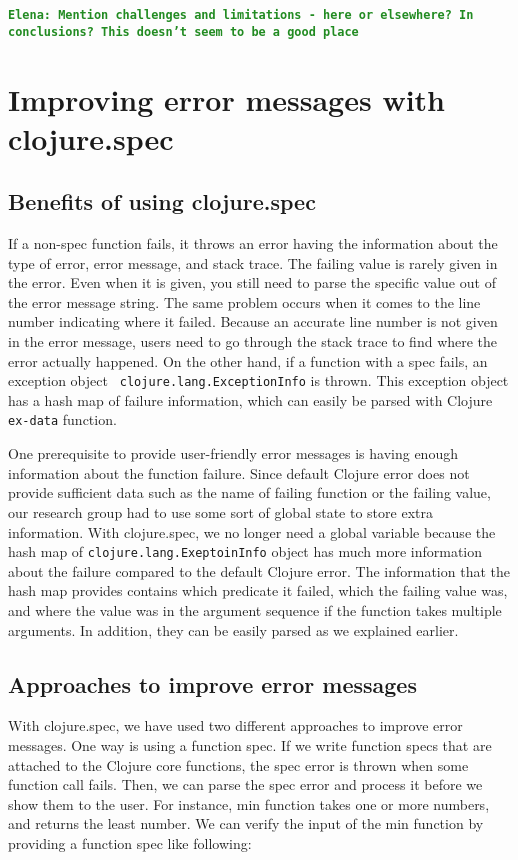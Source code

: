 \documentclass[12pt]{article}
\newcommand{\comment}[1]{{\bf \tt  {#1}}}
\newcommand{\emcomment}[1]{\textcolor{ForestGreen}{\comment{Elena: {#1}}}}
\begin{document}
\emcomment{Mention challenges and limitations - here or elsewhere? In conclusions? 
This doesn't seem to be a good place}

\section{Improving error messages with clojure.spec}
	\subsection{Benefits of using clojure.spec}
	If a non-spec function fails, it throws an error having the information about the type of error, error message, and stack 
	trace. The failing value is rarely given in the error. Even when it is given, you still need to parse the specific value out of 
	the error message string. The same problem occurs when it comes to the line number indicating where it failed. 
	Because an accurate line number is not given in the error message, users need to go through the stack trace to find 
	where the error actually happened. On the other hand, if a function with a spec fails, an exception object {\tt 
	clojure.lang.ExceptionInfo} is thrown. This exception object has a hash map of failure information, which can easily be 
	parsed with Clojure {\tt ex-data} function. 

	One prerequisite to provide user-friendly error messages is having enough information about the function failure. Since 
	default Clojure error does not provide sufficient data such as the name of failing function or the failing value, our 
	research group had to use some sort of global state to store extra information. With clojure.spec, we no longer need a 
	global variable because the hash map of {\tt clojure.lang.ExeptoinInfo} object has much more information about the 
	failure compared to the default Clojure error. The information that the hash map provides contains which predicate it 
	failed, which the failing value was, and where the value was in the argument sequence if the function takes multiple 
	arguments. In addition, they can be easily parsed as we explained earlier.
	
	\subsection{Approaches to improve error messages}
	With clojure.spec, we have used two different approaches to improve error messages. One way is using a function spec. 
	If we write function specs that are attached to the Clojure core functions, the spec error is thrown when some function 
	call fails. Then, we can parse the spec error and process it before we show them to the user. For instance, min function 
	takes one or more numbers, and returns the least number. We can verify the input of the min function by providing a 
	function spec like following:
\end{document}
